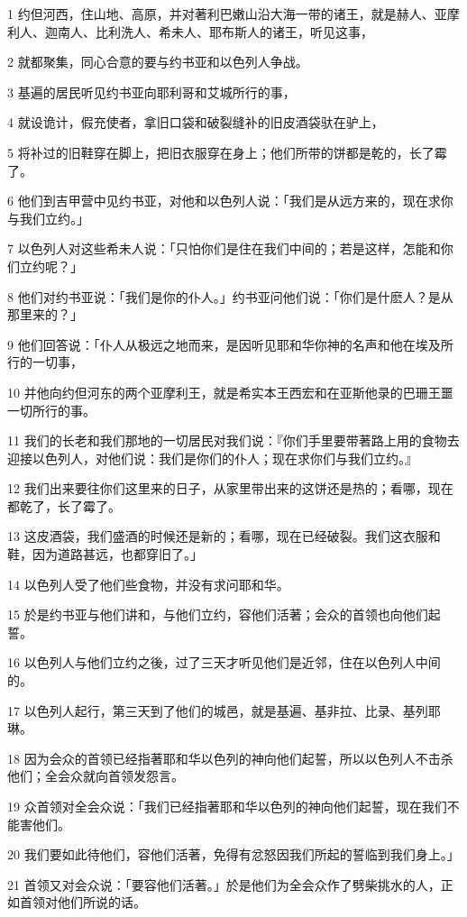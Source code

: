 \par 1 约但河西，住山地、高原，并对著利巴嫩山沿大海一带的诸王，就是赫人、亚摩利人、迦南人、比利洗人、希未人、耶布斯人的诸王，听见这事，
\par 2 就都聚集，同心合意的要与约书亚和以色列人争战。
\par 3 基遍的居民听见约书亚向耶利哥和艾城所行的事，
\par 4 就设诡计，假充使者，拿旧口袋和破裂缝补的旧皮酒袋驮在驴上，
\par 5 将补过的旧鞋穿在脚上，把旧衣服穿在身上；他们所带的饼都是乾的，长了霉了。
\par 6 他们到吉甲营中见约书亚，对他和以色列人说：「我们是从远方来的，现在求你与我们立约。」
\par 7 以色列人对这些希未人说：「只怕你们是住在我们中间的；若是这样，怎能和你们立约呢？」
\par 8 他们对约书亚说：「我们是你的仆人。」约书亚问他们说：「你们是什麽人？是从那里来的？」
\par 9 他们回答说：「仆人从极远之地而来，是因听见耶和华你神的名声和他在埃及所行的一切事，
\par 10 并他向约但河东的两个亚摩利王，就是希实本王西宏和在亚斯他录的巴珊王噩一切所行的事。
\par 11 我们的长老和我们那地的一切居民对我们说：『你们手里要带著路上用的食物去迎接以色列人，对他们说：我们是你们的仆人；现在求你们与我们立约。』
\par 12 我们出来要往你们这里来的日子，从家里带出来的这饼还是热的；看哪，现在都乾了，长了霉了。
\par 13 这皮酒袋，我们盛酒的时候还是新的；看哪，现在已经破裂。我们这衣服和鞋，因为道路甚远，也都穿旧了。」
\par 14 以色列人受了他们些食物，并没有求问耶和华。
\par 15 於是约书亚与他们讲和，与他们立约，容他们活著；会众的首领也向他们起誓。
\par 16 以色列人与他们立约之後，过了三天才听见他们是近邻，住在以色列人中间的。
\par 17 以色列人起行，第三天到了他们的城邑，就是基遍、基非拉、比录、基列耶琳。
\par 18 因为会众的首领已经指著耶和华以色列的神向他们起誓，所以以色列人不击杀他们；全会众就向首领发怨言。
\par 19 众首领对全会众说：「我们已经指著耶和华以色列的神向他们起誓，现在我们不能害他们。
\par 20 我们要如此待他们，容他们活著，免得有忿怒因我们所起的誓临到我们身上。」
\par 21 首领又对会众说：「要容他们活著。」於是他们为全会众作了劈柴挑水的人，正如首领对他们所说的话。
